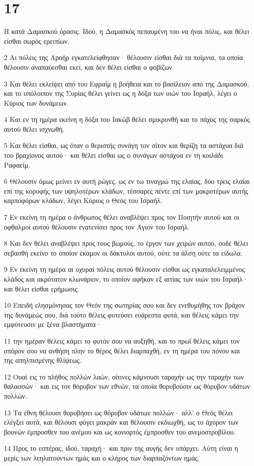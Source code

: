 \chapter{17}

\par Η κατά Δαμασκού όρασις. Ιδού, η Δαμασκός πεπαυμένη του να ήναι πόλις, και θέλει είσθαι σωρός ερειπίων.
\par 2 Αι πόλεις της Αροήρ εγκατελείφθησαν· θέλουσιν είσθαι διά τα ποίμνια, τα οποία θέλουσιν αναπαύεσθαι εκεί, και δεν θέλει είσθαι ο φοβίζων.
\par 3 Και θέλει εκλείψει από του Εφραΐμ η βοήθεια και το βασίλειον από της Δαμασκού, και το υπόλοιπον της Συρίας θέλει γείνει ως η δόξα των υιών του Ισραήλ, λέγει ο Κύριος των δυνάμεων.
\par 4 Και εν τη ημέρα εκείνη η δόξα του Ιακώβ θέλει σμικρυνθή και το πάχος της σαρκός αυτού θέλει ισχνωθή.
\par 5 Και θέλει είσθαι, ως όταν ο θεριστής συνάγη τον σίτον και θερίζη τα αστάχυα διά του βραχίονος αυτού· και θέλει είσθαι ως ο συνάγων αστάχυα εν τη κοιλάδι Ραφαείμ.
\par 6 Θέλουσιν όμως μείνει εν αυτή ρώγες, ως εν τω τιναγμώ της ελαίας, δύο τρεις ελαίαι επί της κορυφής των υψηλοτέρων κλάδων, τέσσαρες πέντε επί των μακροτέρων αυτής καρποφόρων κλάδων, λέγει Κύριος ο Θεός του Ισραήλ.
\par 7 Εν εκείνη τη ημέρα ο άνθρωπος θέλει αναβλέψει προς τον Ποιητήν αυτού και οι οφθαλμοί αυτού θέλουσιν ενατενίσει προς τον Άγιον του Ισραήλ.
\par 8 Και δεν θέλει αναβλέψει προς τους βωμούς, το έργον των χειρών αυτού, ουδέ θέλει σεβασθή εκείνο το οποίον έκαμον οι δάκτυλοι αυτού, ούτε τα άλση ούτε τα είδωλα.
\par 9 Εν εκείνη τη ημέρα αι οχυραί πόλεις αυτού θέλουσιν είσθαι ως εγκαταλελειμμένος κλάδος και ακρότατον κλωνάριον, το οποίον αφήκαν εξ αιτίας των υιών του Ισραήλ· και θέλει είσθαι ερήμωσις.
\par 10 Επειδή ελησμόνησας τον Θεόν της σωτηρίας σου και δεν ενεθυμήθης τον βράχον της δυνάμεώς σου, διά τούτο θέλεις φυτεύσει ευάρεστα φυτά, και θέλεις κάμει την εμφύτευσιν με ξένα βλαστήματα·
\par 11 την ημέραν θέλεις κάμει το φυτόν σου να αυξηθή, και το πρωΐ θέλεις κάμει τον σπόρον σου να ανθήση πλην το θέρος θέλει διαρπαχθή, εν τη ημέρα του πόνου και της απηλπισμένης θλίψεως.
\par 12 Ουαί εις το πλήθος πολλών λαών, οίτινες κάμνουσι ταραχήν ως την ταραχήν των θαλασσών· και εις τον θόρυβον των εθνών, τα οποία θορυβούσιν ως θόρυβον υδάτων πολλών.
\par 13 Τα έθνη θέλουσι θορυβήσει ως θόρυβον υδάτων πολλών· αλλ' ο Θεός θέλει ελέγξει αυτά, και θέλουσι φύγει μακράν και θέλουσιν εκδιωχθή, ως το άχυρον των βουνών έμπροσθεν του ανέμου και ως κονιορτός έμπροσθεν του ανεμοστροβίλου.
\par 14 Προς το εσπέρας, ιδού, ταραχή· και πριν της αυγής δεν υπάρχει. Αύτη είναι η μερίς των λεηλατούντων ημάς και ο κλήρος των διαρπαζόντων ημάς.

